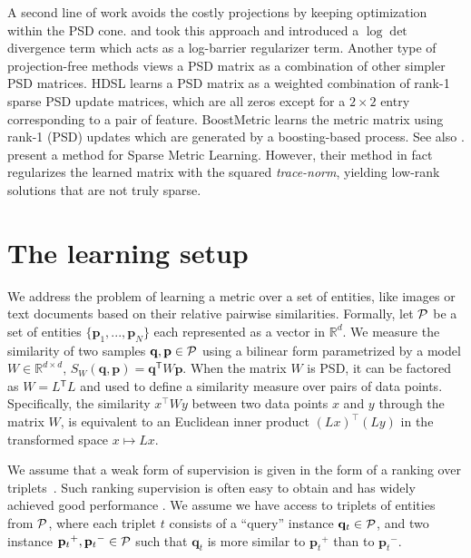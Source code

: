 \documentclass[twoside,11pt]{article}
\newcommand\mat[1]{{#1}}
\renewcommand\vec[1]{\mathbf{#1}}
\newcommand{\T}{{}^\mathsf{T}}
\newcommand{\W}{\mat{W}}
\newcommand{\Rd}{\mathbb{R}^d}
\newcommand{\ignore}[1]{}
\newcommand{\q}{{\vec{q}}}
\newcommand{\p}{{\vec{p}}}
\newcommand{\trip}{{t}}
\newcommand{\qt}{{\q_{\trip}}}
\newcommand{\pt}{{\p_{\trip}}}
\newcommand{\cholL}{\mat{L}}
\begin{document}
A second line of work avoids the costly projections by keeping optimization within the PSD cone. \citet{davis2007information} and \citet{lego} took this approach and introduced a $\log \det$ divergence term which acts as a log-barrier regularizer term. Another type of projection-free methods views a PSD matrix as a combination of other simpler PSD matrices. HDSL \citep{HDSL} learns a PSD matrix as a weighted combination of rank-1 sparse PSD update matrices, which are all zeros except for a $2\times2$ entry corresponding to a pair of feature. BoostMetric \citep{boost} learns the metric matrix using rank-1 (PSD) updates which are generated by a boosting-based process. See also \citet{bi2011adaboost, liu2012robust}. \citet{ying2009sparse} present a method for Sparse Metric Learning. However, their method in fact regularizes the learned matrix with the squared \emph{trace-norm}, yielding low-rank solutions that are not truly sparse.
\ignore{This yields low-rank but not truly sparse metrics. Their method also has a slower convergence rate, and is based on iteratively solving $|T|$-dimensional quadratic problems with linear constraints, where $|T|$ is the number of training triplets, as well as requiring a repeated full eigendecompositions.}

\vspace{-6pt}
\section{The learning setup}
\vskip -5pt
We address the problem of learning a metric over a set of
entities, like images or text documents based on their
relative pairwise similarities. Formally, let $\cal{P}$ be a set of entities $\{\p_1,...,\p_N\}$ each represented as a vector in $\Rd$. We measure the similarity of two samples $\q, \p \in \cal{P}$ using a bilinear form parametrized by a model $\W \in \mathbb{R}^{d \times d}$, $S_{\W}(\q, \p) = \q\T \W \p$.
When the matrix $\W$ is PSD, it can be factored as $\W = \cholL\T \cholL$ and used to define a similarity measure over pairs of data points. Specifically, the similarity $x^\top\W y$ between two data points $x$ and $y$ through the matrix $\W$, is equivalent to an Euclidean inner product  $(\cholL x)^\top(\cholL y)$ in the transformed space $x \mapsto \cholL x$. 

We assume that a weak form of supervision is given in the form of a ranking over triplets~\citep{weinberger2006dml,OASIS,qian}. Such ranking supervision is often easy to obtain and has widely achieved good performance . We assume we have access to triplets of entities from $\cal{P}$, where each triplet $t$ consists of
a ``query'' instance $\qt \in \cal{P}$, and two instance $\pt^{+}, \pt^{-} \in \cal{P}$ such that $\qt$ is more similar to $\pt^{+}$
than to $\pt^{-}$.
\end{document}
